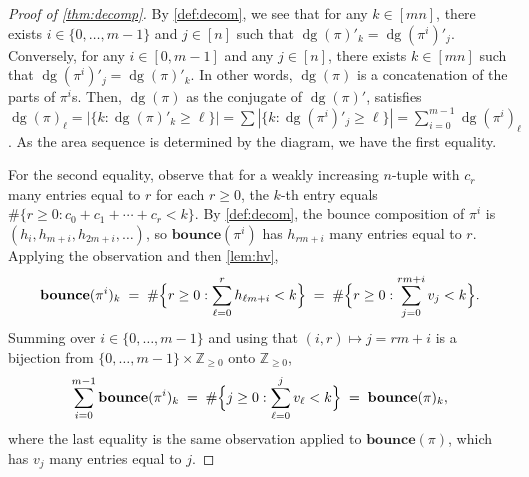 \documentclass[10pt,a4paper]{amsart}
\DeclareMathOperator{\dg}{dg}
\newcommand{\Z}{\mathbb Z}
\newcommand{\bbounce}{\mathbf{bounce}}
\begin{document}
\begin{proof}[Proof of \cref{thm:decomp}]
By \cref{def:decom}, we see that for any $k \in [mn]$, there exists $i \in \{0,\dots,m-1\}$ and $j \in [n]$ such that $\dg(\pi)'_k = \dg(\pi^i)'_j$.
Conversely, for any $i \in [0,m-1]$ and any $j \in [n]$, there exists $k \in [mn]$ such that $\dg(\pi^i)'_j = \dg(\pi)'_k$.
In other words, $\dg(\pi)$ is a concatenation of the parts of $\pi^i$s.
Then, $\dg(\pi)$ as the conjugate of $\dg(\pi)'$, satisfies
$\dg(\pi)_\ell = |\{k: \dg(\pi)'_k \geq \ell\}| = \sum |\{k: \dg(\pi^i)'_j \geq \ell\}| = \sum_{i=0}^{m-1} \dg(\pi^i)_\ell$.
As the area sequence is determined by the diagram, we have the first equality.

For the second equality, observe that for a weakly increasing $n$-tuple with $c_r$ many entries equal to $r$ for each $r \geq 0$, the $k$-th entry equals $\#\{r \geq 0 : c_0 + c_1 + \cdots + c_r < k\}$.
By \cref{def:decom}, the bounce composition of $\pi^i$ is $(h_i, h_{m+i}, h_{2m+i}, \dots)$, so $\bbounce(\pi^i)$ has $h_{rm+i}$ many entries equal to $r$. Applying the observation and then \cref{lem:hv},
\[
\bbounce(\pi^i)_k
\;=\; \#\Bigl\{r \geq 0 : \sum_{\ell=0}^{r} h_{\ell m + i} < k\Bigr\}
\;=\; \#\Bigl\{r \geq 0 : \sum_{j=0}^{rm+i} v_j < k\Bigr\}.
\]
Summing over $i \in \{0,\dots,m-1\}$ and using that $(i,r) \mapsto j = rm+i$ is a bijection from $\{0,\dots,m-1\} \times \Z_{\geq 0}$ onto $\Z_{\geq 0}$,
\[
\sum_{i=0}^{m-1} \bbounce(\pi^i)_k
\;=\; \#\Bigl\{j \geq 0 : \sum_{\ell=0}^{j} v_\ell < k\Bigr\}
\;=\; \bbounce(\pi)_k,
\]
where the last equality is the same observation applied to $\bbounce(\pi)$, which has $v_j$ many entries equal to $j$.
\end{proof}
\end{document}
